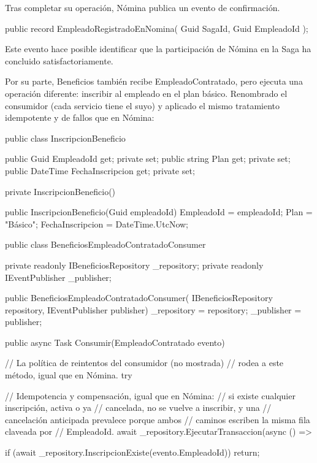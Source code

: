 \documentclass[12pt, a4paper]{article}
\begin{document}
    Tras completar su operación, Nómina publica un evento de confirmación.

    \begin{csharpbox}
public record EmpleadoRegistradoEnNomina(
    Guid SagaId,
    Guid EmpleadoId
);
    \end{csharpbox}

    Este evento hace posible identificar que la participación de Nómina en la Saga ha concluido satisfactoriamente.

    Por su parte, Beneficios también recibe EmpleadoContratado, pero ejecuta una operación diferente: inscribir al empleado en el plan básico. Renombrado el consumidor (cada servicio tiene el suyo) y aplicado el mismo tratamiento idempotente y de fallos que en Nómina:

    \begin{csharpbox}
public class InscripcionBeneficio
{
    public Guid EmpleadoId { get; private set; }
    public string Plan { get; private set; }
    public DateTime FechaInscripcion { get; private set; }

    private InscripcionBeneficio() { }

    public InscripcionBeneficio(Guid empleadoId)
    {
        EmpleadoId = empleadoId;
        Plan = "Básico";
        FechaInscripcion = DateTime.UtcNow;
    }
}

public class BeneficiosEmpleadoContratadoConsumer
{
    private readonly IBeneficiosRepository _repository;
    private readonly IEventPublisher _publisher;

    public BeneficiosEmpleadoContratadoConsumer(
        IBeneficiosRepository repository,
        IEventPublisher publisher)
    {
        _repository = repository;
        _publisher = publisher;
    }

    public async Task Consumir(EmpleadoContratado evento)
    {
        // La política de reintentos del consumidor (no mostrada)
        // rodea a este método, igual que en Nómina.
        try
        {
            // Idempotencia y compensación, igual que en Nómina:
            // si existe cualquier inscripción, activa o ya
            // cancelada, no se vuelve a inscribir, y una
            // cancelación anticipada prevalece porque ambos
            // caminos escriben la misma fila claveada por
            // EmpleadoId.
            await _repository.EjecutarTransaccion(async () =>
            {
                if (await _repository.InscripcionExiste(evento.EmpleadoId))
                    return;

}}}}
\end{csharpbox}
\end{document}
